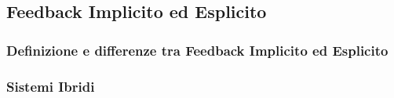 \subsection{Feedback Implicito ed
Esplicito}\label{feedback-implicito-ed-esplicito}

\subsubsection{Definizione e differenze tra Feedback Implicito ed
Esplicito}\label{definizione-e-differenze-tra-feedback-implicito-ed-esplicito}

\subsubsection{Sistemi Ibridi}\label{sistemi-ibridi}
